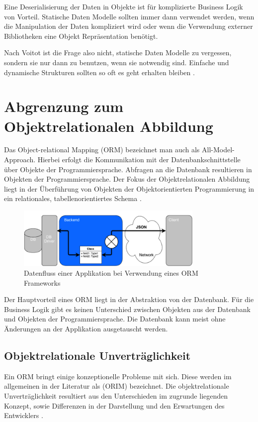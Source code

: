 Eine Deserialisierung der Daten in Objekte ist für komplizierte Business Logik von Vorteil. Statische Daten Modelle sollten immer dann verwendet werden, wenn die Manipulation der Daten kompliziert wird oder wenn die Verwendung externer Bibliotheken eine Objekt Repräsentation benötigt. 

Nach Voitot ist die Frage also nicht, statische Daten Modelle zu vergessen, sondern sie nur dann zu benutzen, wenn sie notwendig sind. Einfache und dynamische Strukturen sollten so oft es geht erhalten bleiben \cite{jctc}.

\section{Abgrenzung zum Objektrelationalen Abbildung}
Das Object-relational Mapping (ORM) bezeichnet man auch als All-Model-Approach. Hierbei erfolgt die Kommunikation mit der Datenbankschnittstelle über Objekte der Programmiersprache. Abfragen an die Datenbank resultieren in Objekten der Programmiersprache. Der Fokus der Objektrelationalen Abbildung liegt in der Überführung von Objekten der Objektorientierten Programmierung in ein relationales, tabellenorientiertes Schema \cite{wambler}. 

\begin{figure}[h]   
  \centering     
  \includegraphics[width=0.8\textwidth]{img/orm.png}  
   \caption{Datenfluss einer Applikation bei Verwendung eines ORM Frameworks}   
  \label{fig:orm} 
\end{figure}

Der Hauptvorteil eines ORM liegt in der Abstraktion von der Datenbank. Für die Business Logik gibt es keinen Unterschied zwischen Objekten aus der Datenbank und Objekten der Programmiersprache. Die Datenbank kann meist ohne Änderungen an der Applikation ausgetauscht werden.

\FloatBarrier
\subsection{Objektrelationale Unverträglichkeit}

Ein ORM bringt einige konzeptionelle Probleme mit sich. Diese werden im allgemeinen in der Literatur als  (ORIM) bezeichnet. Die objektrelationale Unverträglichkeit resultiert aus den Unterschieden im zugrunde liegenden Konzept, sowie Differenzen in der Darstellung und den Erwartungen des Entwicklers \cite{bowers}.

